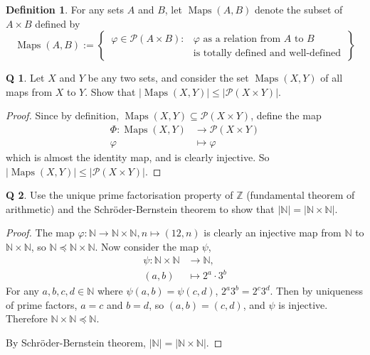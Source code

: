 \documentclass[12pt]{article}
\theoremstyle{definition}
\newtheorem{qn}{Q}
\newtheorem*{defn}{Definition}
\numberwithin{equation}{qn}
\numberwithin{lemma}{qn}
\newcommand{\nat}{\mathbb{N}}
\newcommand{\Int}{\mathbb{Z}}
\let\euscr\mathscr \let\mathscr\relax%
\newcommand{\power}{\euscr{P}}
\renewcommand{\preceq}{\preccurlyeq}
\renewcommand{\leq}{\leqslant}
\DeclareMathOperator{\Maps}{Maps}
\begin{document}
\begin{defn}
    For any sets $A$ and $B$, let $\Maps(A,B)$ denote the subset of $A\times B$ defined by
    $$\Maps(A,B) := \left\{\,
        \begin{array}{ll}
            \varphi\in\power(A\times B): & \mbox{$\varphi$ as a relation from $A$ to $B$} \\
                                         & \mbox{is totally defined and well-defined}
        \end{array}
    \,\right\}$$
\end{defn}
\begin{qn}
    Let $X$ and $Y$ be any two sets, and consider the set $\Maps(X,Y)$ of all maps from $X$ to $Y$.
    Show that $|\Maps(X,Y)| \leq  |\power(X\times Y)|$.
\end{qn}
\begin{proof}
    Since by definition, $\Maps(X,Y)\subseteq \power(X\times Y)$, define the map
    \begin{align*}
        \Phi: \Maps(X,Y) &\rightarrow \power(X\times Y)     \\
                 \varphi &\mapsto     \varphi
    \end{align*}
    which is almost the identity map, and is clearly injective.
    So $|\Maps(X,Y)| \leq  |\power(X\times Y)|$.
\end{proof}

\begin{qn}
    Use the unique prime factorisation property of $\Int$ (fundamental theorem of arithmetic)
    and the Schröder-Bernstein theorem to show that $|\nat| = |\nat\times\nat|$.
\end{qn}
\begin{proof}
    The map $\varphi: \nat\rightarrow\nat\times\nat, n\mapsto (12,n)$ is clearly an injective map
    from $\nat$ to $\nat\times\nat$, so $\nat\preceq \nat\times\nat$.
    Now consider the map $\psi$,
    \begin{align*}
        \psi: \nat\times\nat &\rightarrow \nat,\\
        (a,b) &\mapsto 2^a\cdot3^b
    \end{align*}
    For any $a,b,c,d\in\nat$ where $\psi(a,b) = \psi(c,d)$, $2^a3^b = 2^c3^d$.
    Then by uniqueness of prime factors, $a = c$ and $b = d$, so $(a,b)=(c,d)$, and
    $\psi$ is injective. Therefore $\nat\times\nat \preceq\nat$.

    By Schröder-Bernstein theorem, $|\nat| = |\nat\times\nat|$.
\end{proof}
\end{document}
